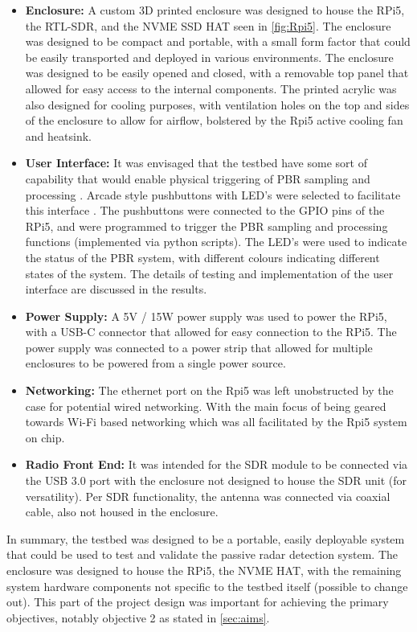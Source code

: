 \begin{itemize}
    \item \textbf{Enclosure:} A custom 3D printed enclosure was designed to house the RPi5, the RTL-SDR, and the NVME SSD HAT seen in \ref{fig:Rpi5}. The enclosure was designed to be compact and portable, with a small form factor that could be easily transported and deployed in various environments. The enclosure was designed to be easily opened and closed, with a removable top panel that allowed for easy access to the internal components. The printed acrylic was also designed for cooling purposes, with ventilation holes on the top and sides of the enclosure to allow for airflow, bolstered by the Rpi5 active cooling fan and heatsink.
    \item \textbf{User Interface:} It was envisaged that the testbed have some sort of capability that would enable physical triggering of PBR sampling and processing . Arcade style pushbuttons with LED's were selected to facilitate this interface \cite{pushbuttons}. The pushbuttons were connected to the GPIO pins of the RPi5, and were programmed to trigger the PBR sampling and processing functions (implemented via python scripts). The LED's were used to indicate the status of the PBR system, with different colours indicating different states of the system. The details of testing and implementation of the user interface are discussed in the results.
    \item \textbf{Power Supply:} A 5V / 15W power supply was used to power the RPi5, with a USB-C connector that allowed for easy connection to the RPi5. The power supply was connected to a power strip that allowed for multiple enclosures to be powered from a single power source.
    \item \textbf{Networking:} The ethernet port on the Rpi5 was left unobstructed by the case for potential wired networking. With the main focus of being geared towards Wi-Fi based networking which was all facilitated by the Rpi5 system on chip.
    \item \textbf{Radio Front End:} It was intended for the SDR module to be connected via the USB 3.0 port with the enclosure not designed to house the SDR unit (for versatility). Per SDR functionality, the antenna was connected via coaxial cable, also not housed in the enclosure. 
    
\end{itemize}

In summary, the testbed was designed to be a portable, easily deployable system that could be used to test and validate the passive radar detection system. The enclosure was designed to house the RPi5, the NVME HAT, with the remaining system hardware components not specific to the testbed itself (possible to change out). This part of the project design was important for achieving the primary objectives, notably objective 2 as stated in \ref{sec:aims}.

